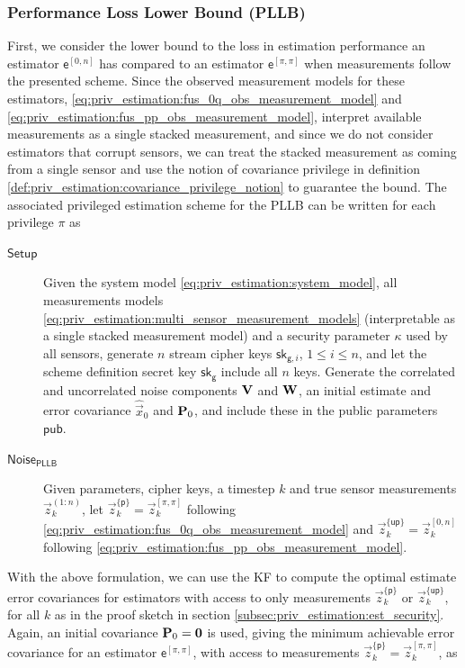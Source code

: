 \subsubsection{Performance Loss Lower Bound (PLLB)}
First, we consider the lower bound to the loss in estimation performance an estimator $\mathsf{e}^{[0, n]}$ has compared to an estimator $\mathsf{e}^{[\pi,\pi]}$ when measurements follow the presented scheme. Since the observed measurement models for these estimators, \eqref{eq:priv_estimation:fus_0q_obs_measurement_model} and \eqref{eq:priv_estimation:fus_pp_obs_measurement_model}, interpret available measurements as a single stacked measurement, and since we do not consider estimators that corrupt sensors, we can treat the stacked measurement as coming from a single sensor and use the notion of covariance privilege in definition \ref{def:priv_estimation:covariance_privilege_notion} to guarantee the bound. The associated privileged estimation scheme for the PLLB can be written for each privilege $\pi$ as
\begin{description}
    \item[$\mathsf{Setup}$] Given the system model \eqref{eq:priv_estimation:system_model}, all measurements models \eqref{eq:priv_estimation:multi_sensor_measurement_models} (interpretable as a single stacked measurement model) and a security parameter $\kappa$ used by all sensors, generate $n$ stream cipher keys $\mathsf{sk}_{\mathsf{g}, i}$, $1\leq i\leq n$, and let the scheme definition secret key $\mathsf{sk}_{\mathsf{g}}$ include all $n$ keys. Generate the correlated and uncorrelated noise components ${{\mathbf{V}}}$ and ${{\mathbf{W}}}$, an initial estimate and error covariance $\hat{\vec{x}}_0$ and ${{\mathbf{P}}}_0$, and include these in the public parameters $\mathsf{pub}$.
  
    \item[$\mathsf{Noise}_{\mathsf{PLLB}}$] Given parameters, cipher keys, a timestep $k$ and true sensor measurements $\vec{z}_k^{(1:n)}$, let $\vec{z}_k^{\{\mathsf{p}\}}=\vec{z}_k^{[\pi,\pi]}$ following \eqref{eq:priv_estimation:fus_0q_obs_measurement_model} and $\vec{z}_k^{\{\mathsf{up}\}}=\vec{z}_k^{[0,n]}$ following \eqref{eq:priv_estimation:fus_pp_obs_measurement_model}.
\end{description}
With the above formulation, we can use the KF to compute the optimal estimate error covariances for estimators with access to only measurements $\vec{z}_k^{\{\mathsf{p}\}}$ or $\vec{z}_k^{\{\mathsf{up}\}}$, for all $k$ as in the proof sketch in section \ref{subsec:priv_estimation:est_security}. Again, an initial covariance ${{\mathbf{P}}}_0={{\mathbf{0}}}$ is used, giving the minimum achievable error covariance for an estimator $\mathsf{e}^{[\pi,\pi]}$, with access to measurements $\vec{z}_k^{\{\mathsf{p}\}}=\vec{z}_k^{[\pi,\pi]}$, as
